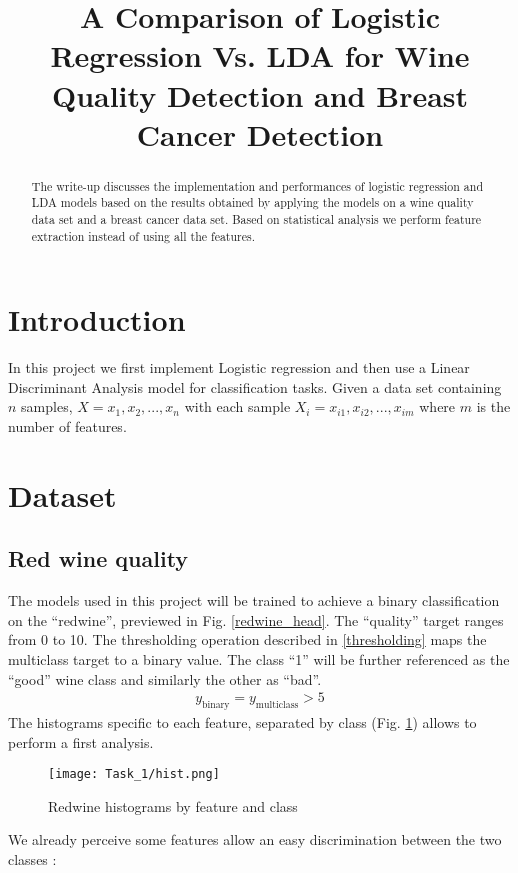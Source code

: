\documentclass[conference]{IEEEtran}
\begin{document}
\title{A Comparison of Logistic Regression Vs. LDA for Wine Quality Detection and Breast Cancer Detection}

\author{
	}

\maketitle
\begin{abstract}
	The write-up discusses the implementation and performances of logistic regression and LDA models based on the results obtained by applying the models on a wine quality data set and a breast cancer data set. Based on statistical analysis we perform feature extraction instead of using all the features.  
\end{abstract}
\section{Introduction}
In this project we first implement Logistic regression and then use a Linear Discriminant Analysis model for classification tasks. Given a data set containing $n$ samples, $X = {x_1, x_2,...,x_n}$ with each sample $X_i = {x_{i1},x_{i2},...,x_{im}}$ where $m$ is the number of features.
\section{Dataset}
\subsection{Red wine quality}
The models used in this project will be trained to achieve a binary classification on the ``redwine'', previewed in Fig. \ref{redwine_head}.
The ``quality'' target ranges from 0 to 10. The thresholding operation described in \eqref{thresholding} maps the multiclass target to a binary value. The class ``1'' will be further referenced as the ``good'' wine class and similarly the other as ``bad''.
\begin{align}
	y_{\text{binary}} = y_{\text{multiclass}} > 5\label{thresholding}
\end{align}
The histograms specific to each feature, separated by class (Fig. \ref{fig:redwine_hist}) allows to perform a first analysis.
\begin{figure}[!b]
    \centering
    \texttt{[image: Task\_1/hist.png]}
    \caption{Redwine histograms by feature and class}
    \label{fig:redwine_hist}
\end{figure}
We already perceive some features allow an easy discrimination between the two classes : 
\end{document}
